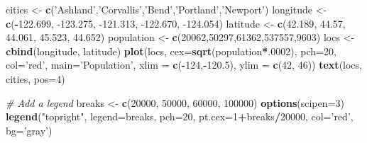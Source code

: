 \documentclass[
]{book}
\newenvironment{Shaded}{\begin{snugshade}}{\end{snugshade}}
\newcommand{\CommentTok}[1]{\textcolor[rgb]{0.56,0.35,0.01}{\textit{#1}}}
\newcommand{\DataTypeTok}[1]{\textcolor[rgb]{0.13,0.29,0.53}{#1}}
\newcommand{\DecValTok}[1]{\textcolor[rgb]{0.00,0.00,0.81}{#1}}
\newcommand{\FloatTok}[1]{\textcolor[rgb]{0.00,0.00,0.81}{#1}}
\newcommand{\KeywordTok}[1]{\textcolor[rgb]{0.13,0.29,0.53}{\textbf{#1}}}
\newcommand{\NormalTok}[1]{#1}
\newcommand{\OperatorTok}[1]{\textcolor[rgb]{0.81,0.36,0.00}{\textbf{#1}}}
\newcommand{\StringTok}[1]{\textcolor[rgb]{0.31,0.60,0.02}{#1}}
\begin{document}
\begin{Shaded}
\begin{Highlighting}[]
\NormalTok{cities <-}\StringTok{ }\KeywordTok{c}\NormalTok{(}\StringTok{'Ashland'}\NormalTok{,}\StringTok{'Corvallis'}\NormalTok{,}\StringTok{'Bend'}\NormalTok{,}\StringTok{'Portland'}\NormalTok{,}\StringTok{'Newport'}\NormalTok{)}
\NormalTok{longitude <-}\StringTok{ }\KeywordTok{c}\NormalTok{(}\OperatorTok{-}\FloatTok{122.699}\NormalTok{, }\FloatTok{-123.275}\NormalTok{, }\FloatTok{-121.313}\NormalTok{, }\FloatTok{-122.670}\NormalTok{, }\FloatTok{-124.054}\NormalTok{)}
\NormalTok{latitude <-}\StringTok{ }\KeywordTok{c}\NormalTok{(}\FloatTok{42.189}\NormalTok{, }\FloatTok{44.57}\NormalTok{, }\FloatTok{44.061}\NormalTok{, }\FloatTok{45.523}\NormalTok{, }\FloatTok{44.652}\NormalTok{)}
\NormalTok{population <-}\StringTok{ }\KeywordTok{c}\NormalTok{(}\DecValTok{20062}\NormalTok{,}\DecValTok{50297}\NormalTok{,}\DecValTok{61362}\NormalTok{,}\DecValTok{537557}\NormalTok{,}\DecValTok{9603}\NormalTok{)}
\NormalTok{locs <-}\StringTok{ }\KeywordTok{cbind}\NormalTok{(longitude, latitude) }
\KeywordTok{plot}\NormalTok{(locs, }\DataTypeTok{cex=}\KeywordTok{sqrt}\NormalTok{(population}\OperatorTok{*}\NormalTok{.}\DecValTok{0002}\NormalTok{), }\DataTypeTok{pch=}\DecValTok{20}\NormalTok{, }\DataTypeTok{col=}\StringTok{'red'}\NormalTok{, }
  \DataTypeTok{main=}\StringTok{'Population'}\NormalTok{, }\DataTypeTok{xlim =} \KeywordTok{c}\NormalTok{(}\OperatorTok{-}\DecValTok{124}\NormalTok{,}\OperatorTok{-}\FloatTok{120.5}\NormalTok{), }\DataTypeTok{ylim =} \KeywordTok{c}\NormalTok{(}\DecValTok{42}\NormalTok{, }\DecValTok{46}\NormalTok{))}
\KeywordTok{text}\NormalTok{(locs, cities, }\DataTypeTok{pos=}\DecValTok{4}\NormalTok{)}

\CommentTok{# Add a legend}
\NormalTok{breaks <-}\StringTok{ }\KeywordTok{c}\NormalTok{(}\DecValTok{20000}\NormalTok{, }\DecValTok{50000}\NormalTok{, }\DecValTok{60000}\NormalTok{, }\DecValTok{100000}\NormalTok{)}
\KeywordTok{options}\NormalTok{(}\DataTypeTok{scipen=}\DecValTok{3}\NormalTok{)}
\KeywordTok{legend}\NormalTok{(}\StringTok{"topright"}\NormalTok{, }\DataTypeTok{legend=}\NormalTok{breaks, }\DataTypeTok{pch=}\DecValTok{20}\NormalTok{, }\DataTypeTok{pt.cex=}\DecValTok{1}\OperatorTok{+}\NormalTok{breaks}\OperatorTok{/}\DecValTok{20000}\NormalTok{, }
  \DataTypeTok{col=}\StringTok{'red'}\NormalTok{, }\DataTypeTok{bg=}\StringTok{'gray'}\NormalTok{)}


\end{Highlighting}
\end{Shaded}
\end{document}
